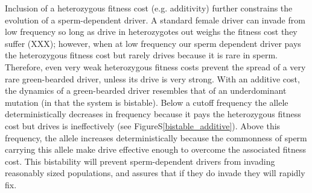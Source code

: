 \documentclass[12pt,letterpaper]{article}
\begin{document}

Inclusion of a heterozygous fitness cost (e.g. additivity) further constrains the evolution of a sperm-dependent driver. 
A  standard female  driver can invade from low frequency so long as drive in heterozygotes out weighs the fitness cost they suffer (XXX); 
	however, when at low frequency our sperm dependent driver pays the heterozygous fitness cost but rarely drives because it is rare in sperm.
Therefore, even very weak heterozygous fitness costs
	prevent the spread of a very rare green-bearded driver, unless its drive is very strong. 
With an additive cost, the dynamics of a green-bearded driver resembles that of an underdominant mutation (in that the system is bistable). 
Below a cutoff frequency the allele deterministically decreases in frequency 
	because it pays the  heterozygous fitness cost  but drives is ineffectively (see FigureS\ref{bistable_additive}). 
Above this frequency, the allele increases deterministically because the commonness of sperm carrying this allele 
	make drive effective enough to overcome the associated fitness cost.
This bistability will  prevent sperm-dependent drivers from invading 	
	reasonably sized populations, and assures that if they do invade they will rapidly fix.

\end{document}
